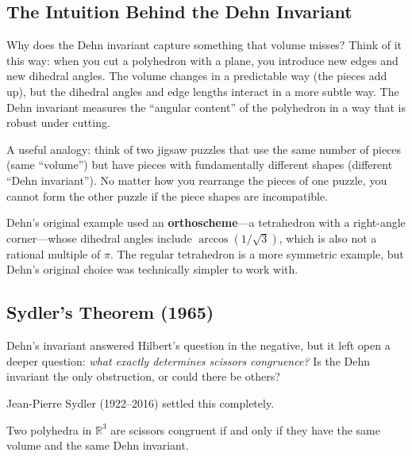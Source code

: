 \subsection{The Intuition Behind the Dehn Invariant}

Why does the Dehn invariant capture something that volume misses? Think of it this way: when you cut a polyhedron with a plane, you introduce new edges and new dihedral angles. The volume changes in a predictable way (the pieces add up), but the dihedral angles and edge lengths interact in a more subtle way. The Dehn invariant measures the ``angular content'' of the polyhedron in a way that is robust under cutting.

A useful analogy: think of two jigsaw puzzles that use the same number of pieces (same ``volume'') but have pieces with fundamentally different shapes (different ``Dehn invariant''). No matter how you rearrange the pieces of one puzzle, you cannot form the other puzzle if the piece shapes are incompatible.

\begin{remark}
Dehn's original example used an \textbf{orthoscheme}---a tetrahedron with a right-angle corner---whose dihedral angles include $\arccos(1/\sqrt{3})$, which is also not a rational multiple of $\pi$. The regular tetrahedron is a more symmetric example, but Dehn's original choice was technically simpler to work with.
\end{remark}

\subsection{Sydler's Theorem (1965)}

Dehn's invariant answered Hilbert's question in the negative, but it left open a deeper question: \emph{what exactly determines scissors congruence?} Is the Dehn invariant the only obstruction, or could there be others?

Jean-Pierre Sydler (1922--2016) settled this completely.

\begin{theorem}[Sydler, 1965]
Two polyhedra in $\mathbb{R}^3$ are scissors congruent if and only if they have the same volume and the same Dehn invariant.
\end{theorem}

